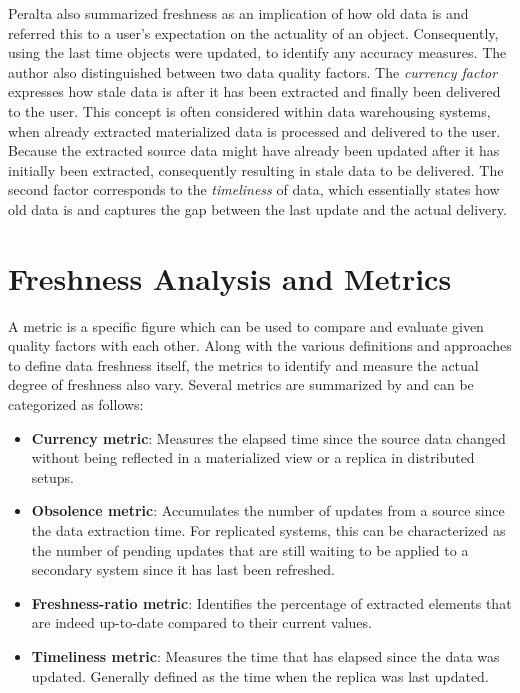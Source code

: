 Peralta \cite{peralta:2006} also summarized freshness as an implication of how old data is and referred this to a user's expectation on the actuality of an object. 
Consequently, using the last time objects were updated, to identify any accuracy measures. The author also distinguished between two data quality factors. 
The \emph{currency factor} expresses how stale data is after it has been extracted and finally been
delivered to the user. This concept is often considered within data warehousing systems, when already extracted materialized data is processed and delivered to the user.
Because the extracted source data might have already been updated after it has initially been extracted, consequently resulting in stale data to be delivered.
The second factor corresponds to the \emph{timeliness} of data, which essentially states how old data is and captures the gap between the last update and the actual delivery.



\section{Freshness Analysis and Metrics}
\label{r:freshness_metrics}
A metric is a specific figure which can be used to compare and evaluate given quality factors with each other.
Along with the various definitions and approaches to define data freshness itself, the metrics to identify and measure the actual degree of freshness also vary.
Several metrics are summarized by \cite{cho:2000, pacitti:2000, peralta:2006} and can be categorized as follows:
\begin{itemize}
    \item \textbf{Currency metric}: Measures the elapsed time since the source data changed without being reflected in a materialized view or a replica in distributed setups.
    \item \textbf{Obsolence metric}: Accumulates the number of updates from a source since the data extraction time. For replicated systems, this can be characterized as the 
    number of pending updates that are still waiting to be applied to a secondary system since it has last been refreshed.
    \item \textbf{Freshness-ratio metric}: Identifies the percentage of extracted elements that are indeed up-to-date compared to their current values.
    \item \textbf{Timeliness metric}: Measures the time that has elapsed since the data was updated. Generally defined as the time when the replica was last updated.
\end{itemize}


